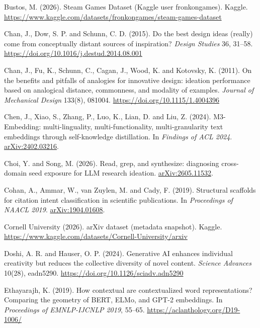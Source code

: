 \documentclass[
  10pt,
]{article}
\begin{document}
\hypertarget{ref-Bustos2026}{}Bustos, M.
(2026). Steam Games Dataset (Kaggle user
fronkongames). Kaggle.
\url{https://www.kaggle.com/datasets/fronkongames/steam-games-dataset}

\hypertarget{ref-Chan2015}{}Chan, J.,
Dow, S. P. and Schunn, C. D. (2015). Do
the best design ideas (really) come from
conceptually distant sources of
inspiration? \emph{Design Studies} 36,
31--58.
\url{https://doi.org/10.1016/j.destud.2014.08.001}

\hypertarget{ref-Chan2011}{}Chan, J.,
Fu, K., Schunn, C., Cagan, J., Wood, K.
and Kotovsky, K. (2011). On the benefits
and pitfalls of analogies for innovative
design: ideation performance based on
analogical distance, commonness, and
modality of examples. \emph{Journal of
Mechanical Design} 133(8), 081004.
\url{https://doi.org/10.1115/1.4004396}

\hypertarget{ref-Chen2024}{}Chen, J.,
Xiao, S., Zhang, P., Luo, K., Lian, D.
and Liu, Z. (2024). M3-Embedding:
multi-linguality, multi-functionality,
multi-granularity text embeddings
through self-knowledge distillation. In
\emph{Findings of ACL 2024}.
\href{https://arxiv.org/abs/2402.03216}{arXiv:2402.03216}.

\hypertarget{ref-Choi2026}{}Choi, Y. and
Song, M. (2026). Read, grep, and
synthesize: diagnosing cross-domain seed
exposure for LLM research ideation.
\href{https://arxiv.org/abs/2605.11532}{arXiv:2605.11532}.

\hypertarget{ref-Cohan2019}{}Cohan, A.,
Ammar, W., van Zuylen, M. and Cady, F.
(2019). Structural scaffolds for
citation intent classification in
scientific publications. In
\emph{Proceedings of NAACL 2019}.
\href{https://arxiv.org/abs/1904.01608}{arXiv:1904.01608}.

\hypertarget{ref-Cornell2026}{}Cornell
University (2026). arXiv dataset
(metadata snapshot). Kaggle.
\url{https://www.kaggle.com/datasets/Cornell-University/arxiv}

\hypertarget{ref-Doshi2024}{}Doshi, A.
R. and Hauser, O. P. (2024). Generative
AI enhances individual creativity but
reduces the collective diversity of
novel content. \emph{Science Advances}
10(28), eadn5290.
\url{https://doi.org/10.1126/sciadv.adn5290}

\hypertarget{ref-Ethayarajh2019}{}Ethayarajh,
K. (2019). How contextual are
contextualized word representations?
Comparing the geometry of BERT, ELMo,
and GPT-2 embeddings. In
\emph{Proceedings of EMNLP-IJCNLP 2019},
55--65.
\url{https://aclanthology.org/D19-1006/}
\end{document}
